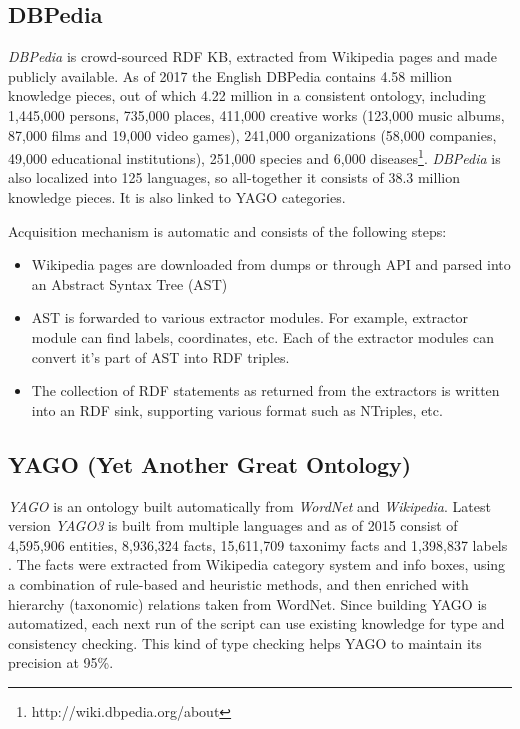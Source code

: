 \subsection{DBPedia}
\label{section_rw:dbpedia}
\emph{DBPedia} is crowd-sourced RDF KB, extracted from Wikipedia pages and made
publicly available\parencite{Lehmann2015}. As of 2017 the English DBPedia contains 4.58 million 
knowledge pieces, out of which 4.22 million in a consistent ontology, 
including 1,445,000 persons, 735,000 places, 411,000 creative works
(123,000 music albums, 87,000 films and 19,000 video games), 
241,000 organizations (58,000 companies, 49,000 educational institutions), 
251,000 species and 6,000 diseases\footnote{http://wiki.dbpedia.org/about}.
\emph{DBPedia} is also localized into 125 languages, so all-together it 
consists of 38.3 million knowledge pieces. It is also linked to YAGO categories.

Acquisition mechanism is automatic and consists of the following steps:
\begin{itemize}
\item Wikipedia pages are downloaded from dumps or through API and parsed into
an Abstract Syntax Tree (AST)
\item  AST is forwarded to various extractor modules. For example, extractor
module can find labels, coordinates, etc. Each of the extractor modules can
convert it's part of AST into RDF triples.
\item The collection of RDF statements as returned from the extractors is 
written into an RDF sink, supporting various format such as NTriples, etc.
\end{itemize}

\subsection{YAGO (Yet Another Great Ontology)}
\label{section_rw:YAGO}
\emph{YAGO} is an ontology built automatically from \emph{WordNet} and 
\emph{Wikipedia}\parencite{Suchanek2008}. Latest version \emph{YAGO3} is built
from multiple languages and as of 2015 consist of 4,595,906 entities, 
8,936,324 facts, 15,611,709 taxonimy facts and 1,398,837 labels
\parencite{Mahdisoltani2015}.
The facts were extracted from Wikipedia category system and info boxes, using
a combination of rule-based and heuristic methods, and then enriched with 
hierarchy (taxonomic) relations taken from WordNet. Since building
YAGO is automatized, each next run of the script can use existing knowledge
for type and consistency checking. This kind of type checking helps YAGO to
maintain its precision at 95\%\parencite{Suchanek2008}.

